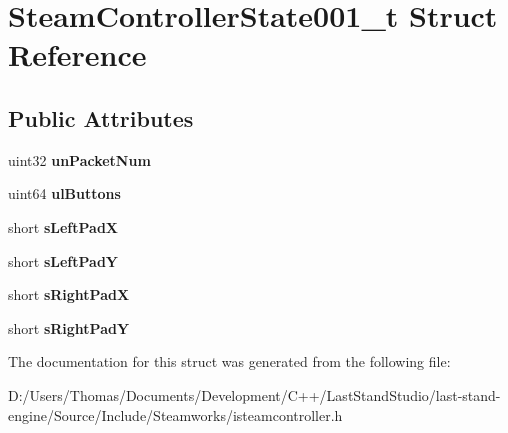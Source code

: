 \hypertarget{structSteamControllerState001__t}{}\section{Steam\+Controller\+State001\+\_\+t Struct Reference}
\label{structSteamControllerState001__t}
\subsection*{Public Attributes}
\begin{DoxyCompactItemize}
\item 
\hypertarget{structSteamControllerState001__t_a0e46942534ee4ed5142da87e04229a66}{}uint32 {\bfseries un\+Packet\+Num}\label{structSteamControllerState001__t_a0e46942534ee4ed5142da87e04229a66}

\item 
\hypertarget{structSteamControllerState001__t_a3f6dc5bcc96718fd363950e1d3f63811}{}uint64 {\bfseries ul\+Buttons}\label{structSteamControllerState001__t_a3f6dc5bcc96718fd363950e1d3f63811}

\item 
\hypertarget{structSteamControllerState001__t_a3e6205b0296f5f190885a9e1216403ea}{}short {\bfseries s\+Left\+Pad\+X}\label{structSteamControllerState001__t_a3e6205b0296f5f190885a9e1216403ea}

\item 
\hypertarget{structSteamControllerState001__t_ae9bc2142c329aaf0c4a8f38f62bc6eba}{}short {\bfseries s\+Left\+Pad\+Y}\label{structSteamControllerState001__t_ae9bc2142c329aaf0c4a8f38f62bc6eba}

\item 
\hypertarget{structSteamControllerState001__t_aa663c17be7f6aec9506536f4d61ddf73}{}short {\bfseries s\+Right\+Pad\+X}\label{structSteamControllerState001__t_aa663c17be7f6aec9506536f4d61ddf73}

\item 
\hypertarget{structSteamControllerState001__t_a5eec95ad80aa7713d0835d2915c4c257}{}short {\bfseries s\+Right\+Pad\+Y}\label{structSteamControllerState001__t_a5eec95ad80aa7713d0835d2915c4c257}

\end{DoxyCompactItemize}


The documentation for this struct was generated from the following file\+:\begin{DoxyCompactItemize}
\item 
D\+:/\+Users/\+Thomas/\+Documents/\+Development/\+C++/\+Last\+Stand\+Studio/last-\/stand-\/engine/\+Source/\+Include/\+Steamworks/isteamcontroller.\+h\end{DoxyCompactItemize}
